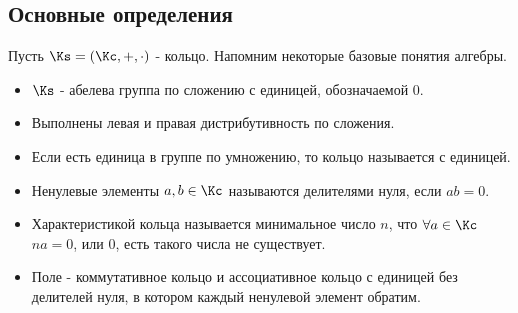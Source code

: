 \documentclass[unicode, 10pt, a4paper, oneside, fleqn]{article}
\begin{document}
\subsection{Основные определения}
Пусть $\Ks=(\Kc,+,\cdot)$ - кольцо.
Напомним некоторые базовые понятия алгебры.
\begin{itemize}
  \item $\Ks$ - абелева группа по сложению с единицей, обозначаемой $0$.
  \item Выполнены левая и правая дистрибутивность по сложения.
  \item Если есть единица в группе по умножению, то кольцо называется с единицей.
  \item  Ненулевые элементы $a,b\in\Kc$ называются делителями нуля, если $ab=0$.
  \item 
    \begin{df}
      Характеристикой кольца называется минимальное число $n$, что $\forall a\in\Kc$ 
      $na=0$, или $0$, есть такого числа не существует.
    \end{df}
    \item Поле - коммутативное кольцо и ассоциативное кольцо с единицей
      без делителей нуля, в котором каждый ненулевой элемент обратим.
\end{itemize}
\end{document}
